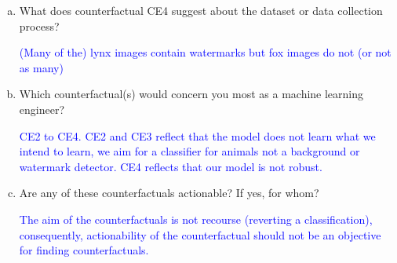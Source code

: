{\begin{enumerate}[a)]
		\textcolor{blue}{CE2 and CE4, changes in the background or removal of the watermark change the prediction but these are not characteristics of the lynx}
		
		\item What does counterfactual CE4 suggest about the dataset or data collection process?
		
		\textcolor{blue}{(Many of the) lynx images contain watermarks but fox images do not (or not as many)}
		
		\item Which counterfactual(s) would concern you most as a machine learning engineer?
		
		\textcolor{blue}{CE2 to CE4. CE2 and CE3 reflect that the model does not learn what we intend to learn, we aim for a classifier for animals not a background or watermark detector. CE4 reflects that our model is not robust.}
		
		\item Are any of these counterfactuals actionable? If yes, for whom?
		
		\textcolor{blue}{The aim of the counterfactuals is not recourse (reverting a classification), consequently, actionability of the counterfactual should not be an objective for finding counterfactuals.}
		
	\end{enumerate}
}